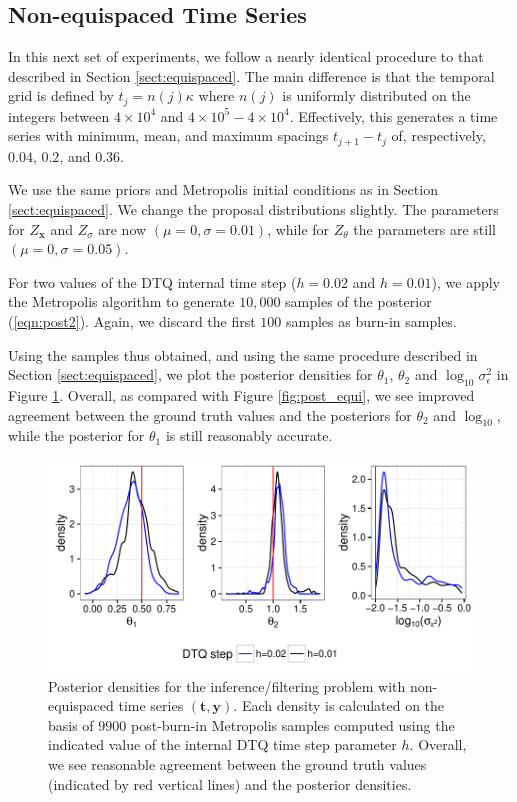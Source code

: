 \documentclass[wcp]{jmlr}
\begin{document}
\subsection{Non-equispaced Time Series}
\label{sect:nonequispaced}
In this next set of experiments, we follow a nearly identical
procedure to that described in Section \ref{sect:equispaced}.  The
main difference is that the temporal grid is defined by $t_j = n(j)
\kappa$ where $n(j)$ is uniformly distributed on the integers between
$4 \times 10^{4}$ and $4 \times 10^5 - 4 \times 10^4$.  Effectively,
this generates a time series with minimum, mean, and maximum spacings
$t_{j+1} - t_j$ of, respectively, $0.04$, $0.2$, and $0.36$.

We use the same priors and Metropolis initial conditions as in Section \ref{sect:equispaced}.  We change
the proposal distributions slightly.  The parameters for
$Z_{\mathbf{x}}$ and $Z_\sigma$ are now $(\mu=0,\sigma=0.01)$, while
for $Z_\theta$ the parameters are still $(\mu=0,\sigma=0.05)$.

For two values of the DTQ internal time step ($h = 0.02$ and
$h=0.01$), we apply the Metropolis algorithm to generate $10,000$
samples of the posterior (\ref{eqn:post2}).  Again, we discard the
first $100$ samples as burn-in samples.

Using the samples thus obtained, and using the same procedure
described in Section \ref{sect:equispaced}, we plot the posterior densities for
$\theta_1$, $\theta_2$ and $\log_{10} \sigma_\epsilon^2$ in Figure
\ref{fig:post_nonequi}.  Overall, as compared with Figure
\ref{fig:post_equi}, we see improved agreement between the ground
truth values and the posteriors for $\theta_2$ and
$\log_{10}$, while the posterior for $\theta_1$ is still reasonably
accurate.


\begin{figure}[th]
\begin{center}
\includegraphics[width=6in]{post_nonequi}
\end{center}
\vspace{-0.25in}
\caption{Posterior densities for the inference/filtering problem with
  non-equispaced time series $(\mathbf{t},\mathbf{y})$.  Each density is
  calculated on the basis of $9900$ post-burn-in Metropolis samples
  computed  using the indicated value of the internal DTQ time step
  parameter $h$.  Overall, we see reasonable agreement between the
  ground truth values (indicated by red vertical lines) and the
  posterior densities.}
\label{fig:post_nonequi}
\end{figure}
\end{document}
